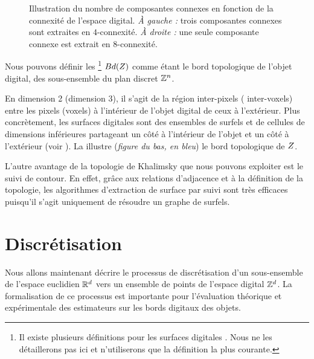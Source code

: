 \begin{figure}[ht]
  \begin{center}
    
  \end{center}
  \caption[Illustration du nombre de composantes connexes en fonction de la connexité de l'espace digital.]
  {Illustration du nombre de composantes connexes en fonction de la connexité de
  l'espace digital. \emph{À gauche :} trois composantes connexes sont extraites
  en $4$-connexité. \emph{À droite :} une seule composante connexe est extrait
  en $8$-connexité.\label{fig:connexite}}
\end{figure}


Nous pouvons définir les \footnote{Il existe
plusieurs définitions pour les surfaces digitales \cite{Rosenfeld1979,
Latecki1995}. Nous ne les détaillerons pas ici et n'utiliserons que la
définition la plus courante.} $Bd(Z)$ comme étant le bord
topologique de l'objet digital, \cad des sous-ensemble du plan discret $\mathbb{Z}^n$.



En dimension 2 (\respp dimension 3), il s'agit de la région inter-pixels (\resp
inter-voxels) entre les pixels (\resp voxels) à l'intérieur de l'objet digital de
ceux à l'extérieur. Plus concrètement, les surfaces digitales sont des ensembles
de surfels et de cellules de dimensions inférieures partageant un côté à
l'intérieur de l'objet et un côté à l'extérieur (voir \cite{Herman1998,
Udupa1994, Kong1992}). La  illustre (\emph{figure du
bas, en bleu}) le bord topologique de $Z$.

%     

L'autre avantage de la topologie de Khalimsky que nous pouvons exploiter est le
suivi de contour. En effet, grâce aux relations d'adjacence et à la définition
de la topologie, les algorithmes d'extraction de surface par suivi sont très
efficaces puisqu'il s'agit uniquement de résoudre un graphe de surfels.

%
\section{Discrétisation}
\label{sec:digitization}
%
Nous allons maintenant décrire le processus de discrétisation d'un sous-ensemble
de l'espace euclidien $\mathbb{R}^d$ vers un ensemble de points de l'espace digital
$\mathbb{Z}^d$. La formalisation de ce processus est importante pour l'évaluation
théorique et expérimentale des estimateurs sur les bords digitaux des objets.


